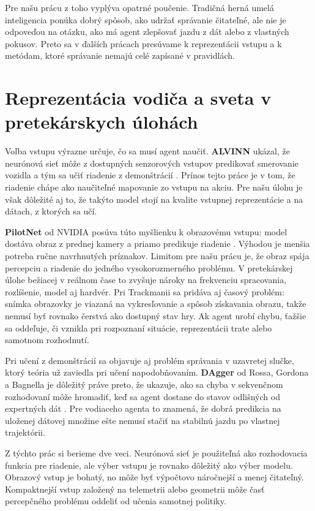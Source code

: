 Pre našu prácu z toho vyplýva opatrné poučenie. Tradičná herná umelá inteligencia ponúka dobrý spôsob, ako udržať správanie čitateľné, ale nie je odpoveďou na otázku, ako má agent zlepšovať jazdu z dát alebo z vlastných pokusov. Preto sa v ďalších prácach presúvame k reprezentácii vstupu a k metódam, ktoré správanie nemajú celé zapísané v pravidlách.

\section{Reprezentácia vodiča a sveta v pretekárskych úlohách}

Voľba vstupu výrazne určuje, čo sa musí agent naučiť. \textbf{ALVINN} ukázal, že neurónová sieť môže z dostupných senzorových vstupov predikovať smerovanie vozidla a tým sa učiť riadenie z demonštrácií \cite{pomerleau1989alvinn}. Prínos tejto práce je v tom, že riadenie chápe ako naučiteľné mapovanie zo vstupu na akciu. Pre našu úlohu je však dôležité aj to, že takýto model stojí na kvalite vstupnej reprezentácie a na dátach, z ktorých sa učí.

\textbf{PilotNet} od NVIDIA posúva túto myšlienku k obrazovému vstupu: model dostáva obraz z prednej kamery a priamo predikuje riadenie \cite{bojarski2016endtoend}. Výhodou je menšia potreba ručne navrhnutých príznakov. Limitom pre našu prácu je, že obraz spája percepciu a riadenie do jedného vysokorozmerného problému. V pretekárskej úlohe bežiacej v reálnom čase to zvyšuje nároky na frekvenciu spracovania, rozlíšenie, model aj hardvér. Pri Trackmanii sa pridáva aj časový problém: snímka obrazovky je viazaná na vykresľovanie a spôsob získavania obrazu, takže nemusí byť rovnako čerstvá ako dostupný stav hry. Ak agent urobí chybu, ťažšie sa oddeľuje, či vznikla pri rozpoznaní situácie, reprezentácii trate alebo samotnom rozhodnutí.

Pri učení z demonštrácií sa objavuje aj problém správania v uzavretej slučke, ktorý teória už zaviedla pri učení napodobňovaním. \textbf{DAgger} od Rossa, Gordona a Bagnella je dôležitý práve preto, že ukazuje, ako sa chyba v sekvenčnom rozhodovaní môže hromadiť, keď sa agent dostane do stavov odlišných od expertných dát \cite{ross2011dagger}. Pre vodiaceho agenta to znamená, že dobrá predikcia na uloženej dátovej množine ešte nemusí stačiť na stabilnú jazdu po vlastnej trajektórii.

Z týchto prác si berieme dve veci. Neurónová sieť je použiteľná ako rozhodovacia funkcia pre riadenie, ale výber vstupu je rovnako dôležitý ako výber modelu. Obrazový vstup je bohatý, no môže byť výpočtovo náročnejší a menej čitateľný. Kompaktnejší vstup založený na telemetrii alebo geometrii môže časť percepčného problému oddeliť od učenia samotnej politiky.

